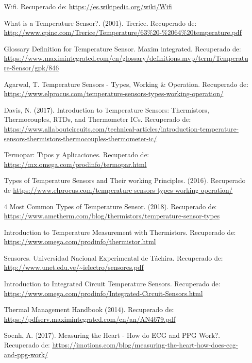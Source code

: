 \begin{thebibliography}{0}
	 Wifi. Recuperado de: \url{https://es.wikipedia.org/wiki/Wifi}
	
	
	 What is a Temperature Sensor?. (2001). Trerice. Recuperado de: \url{http://www.cpinc.com/Trerice/Temperature/63%20-%2064%20temperature.pdf}
	
	 Glossary Definition for Temperature Sensor. Maxim integrated. Recuperado de: \url{https://www.maximintegrated.com/en/glossary/definitions.mvp/term/Temperature-Sensor/gpk/846}
	
	 Agarwal, T.  Temperature Sensors - Types, Working \& Operation. Recuperado de: \url{https://www.elprocus.com/temperature-sensors-types-working-operation/}
	
	 Davis, N. (2017). Introduction to Temperature Sensors: Thermistors, Thermocouples, RTDs, and Thermometer ICs. Recuperado de: \url{https://www.allaboutcircuits.com/technical-articles/introduction-temperature-sensors-thermistors-thermocouples-thermometer-ic/}
	
	 Termopar: Tipos y Aplicaciones. Recuperado de: \url{ https://mx.omega.com/prodinfo/termopar.html}
	
	 Types of Temperature Sensors and Their working Principles. (2016). Recuperado de \url{https://www.elprocus.com/temperature-sensors-types-working-operation/}
	
	 4 Most Common Types of Temperature Sensor. (2018). Recuperado de: \url{https://www.ametherm.com/blog/thermistors/temperature-sensor-types}
	
	 Introduction to Temperature Measurement with Thermistors. Recuperado de: \url{https://www.omega.com/prodinfo/thermistor.html}
	
	 Sensores. Universidad Nacional Experimental de Táchira. Recuperado de: \url{http://www.unet.edu.ve/~ielectro/sensores.pdf}
	
	 Introduction to Integrated Circuit Temperature Sensors. Recuperado de: \url{https://www.omega.com/prodinfo/Integrated-Circuit-Sensors.html}
	
	 Thermal Management Handbook (2014). Recuperado de: \url{https://pdfserv.maximintegrated.com/en/an/AN4679.pdf}
	
	 Soenh, A. (2017). Measuring the Heart - How do ECG and PPG Work?. Recuperado de: \url{https://imotions.com/blog/measuring-the-heart-how-does-ecg-and-ppg-work/}
	

\end{thebibliography}
